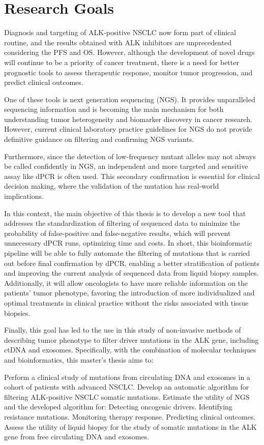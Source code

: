 \chapter{Research Goals}

Diagnosis and targeting of ALK-positive NSCLC now form part of clinical routine, and the results obtained with ALK inhibitors are unprecedented considering the PFS and OS. However, although the development of novel drugs will continue to be a priority of cancer treatment, there is a need for better prognostic tools to assess therapeutic response, monitor tumor progression, and predict clinical outcomes.

One of these tools is next generation sequencing (NGS). It provides unparalleled sequencing information and is becoming the main mechanism for both understanding tumor heterogeneity and biomarker discovery in cancer research. However, current clinical laboratory practice guidelines for NGS do not provide definitive guidance on filtering and confirming NGS variants.

Furthermore, since the detection of low-frequency mutant alleles may not always be called confidently in NGS, an independent and more targeted and sensitive assay like dPCR is often used. This secondary confirmation is essential for clinical decision making, where the validation of the mutation has real-world implications.

In this context, the main objective of this thesis is to develop a new tool that addresses the standardization of filtering of sequenced data to minimize the probability of false-positive and false-negative results, which will prevent unnecessary dPCR runs, optimizing time and costs. In short, this bioinformatic pipeline will be able to fully automate the filtering of mutations that is carried out before final confirmation by dPCR, enabling a better stratification of patients and improving the current analysis of sequenced data from liquid biopsy samples. Additionally, it will allow oncologists to have more reliable information on the patients' tumor phenotype, favoring the introduction of more individualized and optimal treatments in clinical practice without the risks associated with tissue biopsies.

Finally, this goal has led to the use in this study of non-invasive methods of describing tumor phenotype to filter driver mutations in the ALK gene, including ctDNA and exosomes. Specifically, with the combination of molecular techniques and bioinformatics, this master's thesis aims to:
\begin{outline}
    \1 Perform a clinical study of mutations from circulating DNA and exosomes in a cohort of patients with advanced NSCLC.
    \1 Develop an automatic algorithm for filtering ALK-positive NSCLC somatic mutations.
    \1 Estimate the utility of NGS and the developed algorithm for:
        \2 Detecting oncogenic drivers.
        \2 Identifying resistance mutations.
        \2 Monitoring therapy response.
        \2 Predicting clinical outcomes.
    \1 Assess the utility of liquid biopsy for the study of somatic mutations in the ALK gene from free circulating DNA and exosomes.
\end{outline}